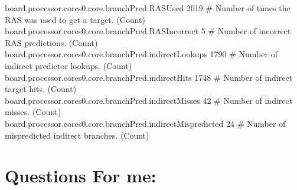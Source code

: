 board.processor.cores0.core.branchPred.RASUsed         2019 \# Number of times the RAS was used to get a target. (Count)\\
board.processor.cores0.core.branchPred.RASIncorrect     5 \# Number of incorrect RAS predictions. (Count)\\
board.processor.cores0.core.branchPred.indirectLookups  1790 \# Number of indirect predictor lookups. (Count)\\
board.processor.cores0.core.branchPred.indirectHits     1748 \# Number of indirect target hits. (Count)\\
board.processor.cores0.core.branchPred.indirectMisses    42 \# Number of indirect misses. (Count)\\
board.processor.cores0.core.branchPred.indirectMispredicted  24 \# Number of mispredicted indirect branches. (Count)\\

\section*{Questions For me: }
